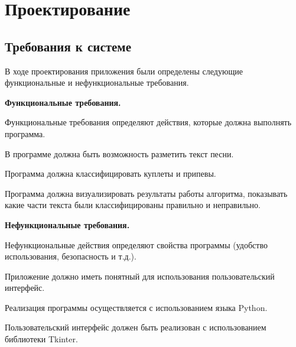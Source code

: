 \newpage
\section{Проектирование}
\label{sec:Definition}
 
\subsection{Требования к системе}
В ходе проектирования приложения были определены следующие функциональные и нефункциональные требования.

\textbf{Функциональные требования.}

Функциональные требования определяют действия, которые должна выполнять программа.
\begin{enumerateparen}
    \item В программе должна быть возможность разметить текст песни.
    \item Программа должна классифицировать куплеты и припевы.
    \item Программа должна визуализировать результаты работы алгоритма, показывать какие части текста были классифицированы правильно и неправильно.
\end{enumerateparen}

\textbf{Нефункциональные требования.}

Нефункциональные действия определяют свойства программы (удобство использования, безопасность и т.д.). 
\begin{enumerateparen}
    \item Приложение должно иметь понятный для использования пользовательский интерфейс.
    \item Реализация программы осуществляется с использованием языка Python.
    \item Пользовательский интерфейс должен быть реализован с использованием библиотеки Tkinter.
\end{enumerateparen}


\vspace{2em}
